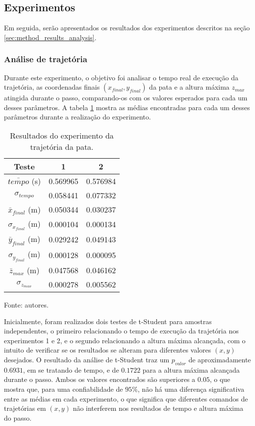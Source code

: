 \documentclass[../main.tex]{subfiles}
\begin{document}
  \subsection{Experimentos}
  Em seguida, serão apresentados os resultados dos experimentos descritos na seção \ref{sec:method_results_analysis}.

  \subsubsection{Análise de trajetória}
  Durante este experimento, o objetivo foi analisar o tempo real de execução da trajetória, as coordenadas finais $(x_{final}, y_{final})$ da pata e a altura máxima $z_{max}$ atingida durante o passo, comparando-os com os valores esperados para cada um desses parâmetros. A tabela \ref{tab:trajetoria} mostra as médias encontradas para cada um desses parâmetros durante a realização do experimento.

  \begin{table}[!htb]
    \caption{Resultados do experimento da trajetória da pata.}
    \centering
    \begin{tabular}{ccc}
      \hline
      Teste & 1         & 2        \\
      \hline
      $\bar{tempo}$ (s)          & 0.569965  & 0.576984 \\
      \hline
      $\sigma_{tempo}$            & 0.058441  & 0.077332 \\
      \hline
      $\bar{x}_{final}$ (m)     & 0.050344  & 0.030237 \\
      \hline
      $\sigma_{x_{final}}$ (m)  & 0.000104  & 0.000134 \\
      \hline
      $\bar{y}_{final}$ (m)     & 0.029242  & 0.049143 \\      
      \hline
      $\sigma_{y_{final}}$ (m)  & 0.000128  & 0.000095 \\      
      \hline
      $\bar{z}_{max}$ (m)       & 0.047568  & 0.046162 \\      
      \hline
      $\sigma_{z_{max}}$    & 0.000278  & 0.005562 \\
      \hline   
    \end{tabular}

    Fonte: autores.
    \label{tab:trajetoria}
  \end{table}

  Inicialmente, foram realizados dois testes de t-Student para amostras independentes, o primeiro relacionando o tempo de execução da trajetória nos experimentos 1 e 2, e o segundo relacionando a altura máxima alcançada, com o intuito de verificar se os resultados se alteram para diferentes valores $(x, y)$ desejados. O resultado da análise de t-Student traz um $p_{valor}$ de aproximadamente $0.6931$, em se tratando de tempo, e de $0.1722$ para a altura máxima alcançada durante o passo. Ambos os valores encontrados são superiores a $0.05$, o que mostra que, para uma confiabilidade de $95\%$, não há uma diferença significativa entre as médias em cada experimento, o que significa que diferentes comandos de trajetórias em $(x, y)$ não interferem nos resultados de tempo e altura máxima do passo.
  
\end{document}
